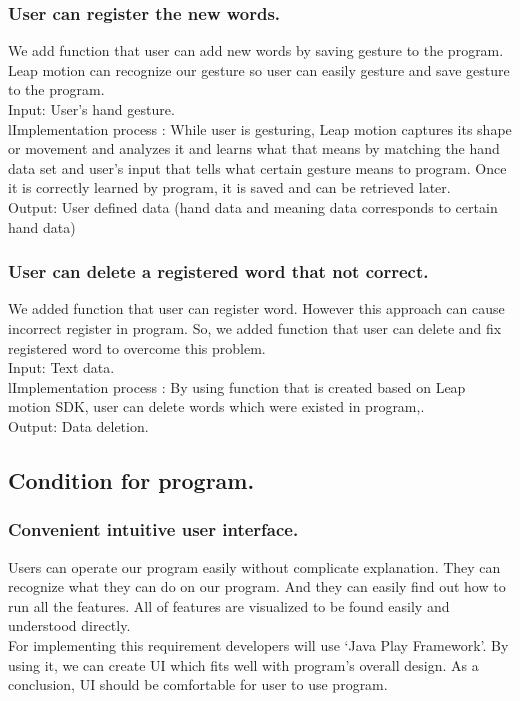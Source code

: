 \documentclass[10pt,journal,compsoc]{IEEEtran}
\begin{document}
\subsubsection{ User can register the new words.}

We add function that user can add new words by saving gesture to the program. Leap motion can recognize our gesture so user can easily gesture and save gesture to the program.
\\Input:  User’s hand gesture.
\\lImplementation process :   While user is gesturing, Leap motion captures its shape or movement and analyzes it and learns what that means by matching the hand data set and user’s input that tells what certain gesture means to program. Once it is correctly learned by program, it is saved and can be retrieved later.
\\Output: User defined data (hand data and meaning data corresponds to certain hand data)

\subsubsection{ User can delete a registered word that not correct.}

We added function that user can register word. However this approach can cause incorrect register in program. So, we added function that user can delete and fix registered word to overcome this problem.
\\Input:  Text data.
\\lImplementation process :   By using function that is created based on Leap motion SDK, user can delete words which were existed in program,.
\\Output:  Data deletion.

\subsection{Condition for program.\\}

\subsubsection{Convenient intuitive user interface.}

Users can operate our program easily without complicate explanation. They can recognize what they can do on our program. And they can easily find out how to run all the features. All of features are visualized to be found easily and understood directly.
\\For implementing this requirement developers will use ‘Java Play Framework’. By using it, we can create UI which fits well with program's overall design. As a conclusion, UI should be comfortable for user to use program.
\end{document}
